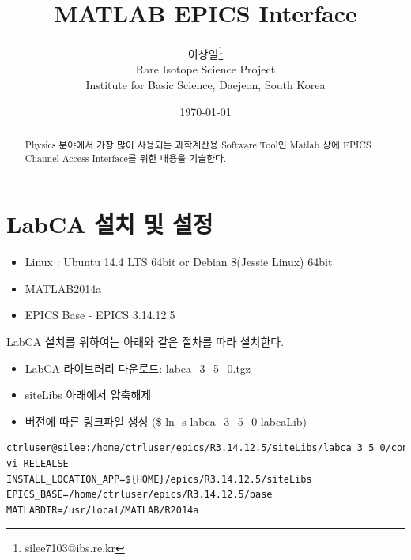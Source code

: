\documentclass[11pt
  , a4paper
  , article
  , oneside
]{memoir}
\begin{document}
\newcommand{\technumber}{
  RAON Control-Document Series\\
  Revision : v1.0,   Release : 2015-03-16 fixed date}
\title{\textbf{MATLAB EPICS Interface}}

\author{이상일\thanks{silee7103@ibs.re.kr} \\

  Rare Isotope Science Project\\
  Institute for Basic Science, Daejeon, South Korea
}
\date{\today}

\renewcommand{\maketitlehooka}{\begin{flushright}\textsf{\technumber}\end{flushright}}

\maketitle

\begin{abstract}
Physics 분야에서 가장 많이 사용되는 과학계산용 Software Tool인 Matlab 상에 EPICS Channel Access Interface를 위한 내용을 기술한다.
\end{abstract}

\clearpage

\chapter{LabCA 설치 및 설정 }

\begin{itemize}
	\item Linux : Ubuntu 14.4 LTS 64bit or Debian 8(Jessie Linux) 64bit
	\item MATLAB2014a
	\item EPICS Base - EPICS 3.14.12.5
\end{itemize}

LabCA 설치를 위하여는 아래와 같은 절차를 따라 설치한다.

\begin{itemize}
	\item LabCA 라이브러리 다운로드: labca\_3\_5\_0.tgz
	\item siteLibs 아래에서 압축해제
	\item 버전에 따른 링크파일 생성 (\$ ln -s labca\_3\_5\_0 labcaLib)
\end{itemize}

\begin{lstlisting}[style=termstyle]
ctrluser@silee:/home/ctrluser/epics/R3.14.12.5/siteLibs/labca_3_5_0/configure$ vi RELEALSE
INSTALL_LOCATION_APP=${HOME}/epics/R3.14.12.5/siteLibs
EPICS_BASE=/home/ctrluser/epics/R3.14.12.5/base
MATLABDIR=/usr/local/MATLAB/R2014a
\end{lstlisting}
\end{document}
